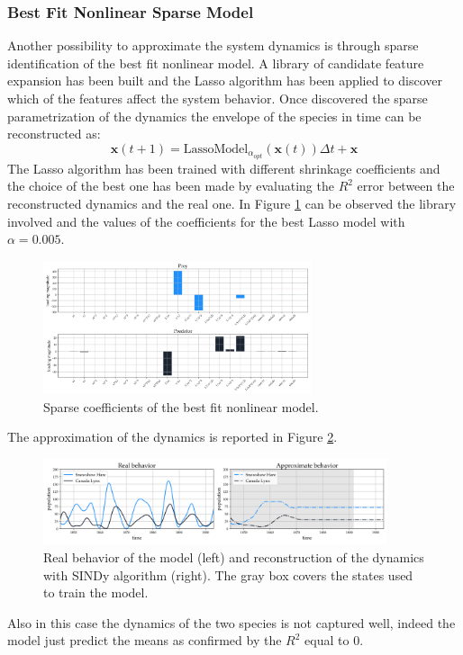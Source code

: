 \documentclass[]{article}
\begin{document}
\subsubsection{Best Fit Nonlinear Sparse Model}
Another possibility to approximate the system dynamics is through sparse identification of the best fit nonlinear model. A library of candidate feature expansion has been built and the Lasso algorithm has been applied to discover which of the features affect the system behavior. Once discovered the sparse parametrization of the dynamics the envelope of the species in time can be reconstructed as:
\begin{equation}\label{nlbestfit}
\textbf{x}(t+1) = \text{LassoModel}_{\alpha_{opt}}(\textbf{x}(t)) \Delta t + \textbf{x}
\end{equation}
The Lasso algorithm has been trained with different shrinkage coefficients and the choice of the best one has been made by evaluating the $R^2$ error between the reconstructed dynamics and the real one. In Figure \ref{fig:fig5} can be observed the library involved and the values of the coefficients for the best Lasso model with $\alpha=0.005$.
\begin{figure}[!t]
	\centering
	\includegraphics[width=0.7\textwidth]{../figures/nl_param_fit.png}
	\caption{Sparse coefficients of the best fit nonlinear model.}
	\label{fig:fig5}
\end{figure}
The approximation of the dynamics is reported in Figure \ref{fig:fig6}.
\begin{figure}[!b]
	\centering
	\includegraphics[width=0.9\textwidth]{../figures/nl_history_fit.png}
	\caption{Real behavior of the model (left) and reconstruction of the dynamics with SINDy algorithm (right). The gray box covers the states used to train the model.}
	\label{fig:fig6}
\end{figure}
Also in this case the dynamics of the two species is not captured well, indeed the model just predict the means as confirmed by the $R^2$ equal to $0$.
\end{document}
